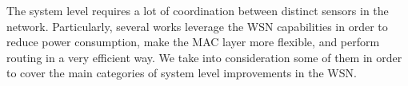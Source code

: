 The system level requires a lot of coordination between distinct sensors in the network. Particularly, several works leverage the WSN capabilities in order to reduce power consumption, make the MAC layer more flexible, and perform routing in a very efficient way. We take into consideration some of them in order to cover the main categories of system level improvements in the WSN.


